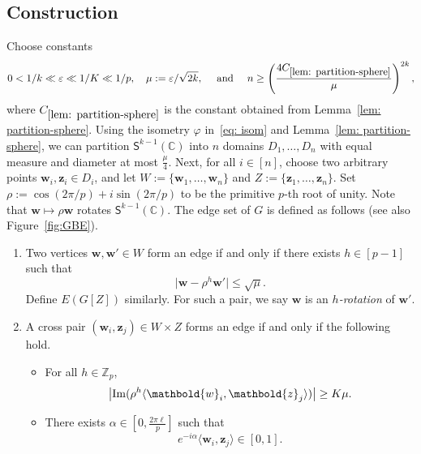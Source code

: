 \documentclass[10pt,a4paper]{article}
\newcounter{propcounter}
\newcommand\innerp[1]{\langle #1 \rangle}
\newcommand{\V}[1]{\mathbold{#1}}
\theoremstyle{definition}
\def\eps{{\varepsilon}}
\newcommand{\im}[1]{{\rm{Im}}(#1)}
\newcommand{\sS}{\mathsf{S}}
\newcommand{\sC}{\mathbb{C}}
\newcommand{\sZ}{\mathbb{Z}}
\newcommand*{\bigabs}[1]{\bigl|#1\bigr|}
\begin{document}
\subsection{Construction}
Choose constants
\begin{align}\label{eq-hierarchy}
	0 < 1/k\ll \eps\ll 1/K\ll  1/p,\quad \mu:=\eps/\sqrt{2k}, \quad\text{ and }\quad n \geq \left(\frac{4C_{\ref{lem: partition-sphere}}}{\mu}\right)^{2k},
\end{align}
where $C_{\ref{lem: partition-sphere}}$ is the constant obtained from Lemma~\ref{lem: partition-sphere}.
Using the isometry $\varphi$ in~\eqref{eq: isom} and Lemma~\ref{lem: partition-sphere}, we can partition $\sS^{k-1}(\sC)$ into $n$ domains $D_1,\ldots,D_n$ with equal measure and  diameter at most $\frac{\mu}{4}$. Next, for all $i\in [n]$, choose two arbitrary points $\V{w}_i,\V{z}_i\in D_i$, and let $W:=\{\V{w}_1,\ldots,\V{w}_n\}$ and $Z:=\{\V{z}_1,\ldots,\V{z}_n\}$. Set $\rho:=\cos(2\pi/ p)+i\sin(2\pi/ p)$ to be the primitive $ p$-th root of unity. 
Note that $\V{w} \mapsto \rho \V{w}$ rotates $\sS^{k-1}(\mathbb{C})$.
The edge set of $G$ is defined as follows (see also Figure~\ref{fig:GBE}).
\begin{enumerate}[label = {\bfseries \Alph{propcounter}\arabic{enumi}}]
	\item\label{it-insideW} Two vertices $\V{w}, \V{w}'\in W$ form an edge if and only if there exists $h\in [p-1]$ such that 
	$$\bigabs{\V{w}-\rho^h\V{w}'}\le \sqrt{\mu}.$$
	Define $E(G[Z])$ similarly. For such a pair, we say $\V{w}$ is an \emph{$h$-rotation} of $\V{w}'$.
	
	\item\label{it-between} A cross pair $(\V{w}_i, \V{z}_j)\in W\times Z$ forms an edge if and only if the following hold.
	\begin{itemize}
		\item[(i)] For all $h\in \sZ_p$,
		$$\bigabs{\im{\rho^h\innerp{\V{w}_i,\V{z}_j}}}\ge K\mu.$$
		
		\item[(ii)] There exists $\alpha\in [0,\frac{2\pi \ell}{p}]$ such that 
		$$e^{-i\alpha}\innerp{\V{w}_i,\V{z}_j}\in [0,1].$$
	\end{itemize}
\end{enumerate}
\end{document}
